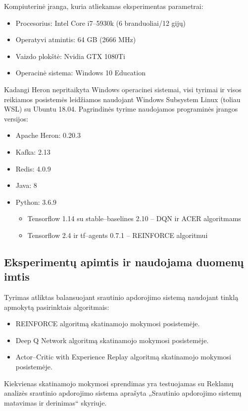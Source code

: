 \documentclass{VUMIFPSbakalaurinis}
\begin{document}
Kompiuterinė įranga, kuria atliekamas eksperimentas parametrai:
\begin{itemize}
    \item Procesorius: Intel Core i7–5930k (6 branduoliai/12 gijų)
    \item Operatyvi atmintis: 64 GB (2666 MHz)
    \item Vaizdo plokštė: Nvidia GTX 1080Ti
    \item Operacinė sistema: Windows 10 Education
\end{itemize}

Kadangi Heron nepritaikyta Windows operacinei sistemai, visi tyrimai ir visos reikiamos posistemės leidžiamos naudojant Windows Subsystem Linux (toliau WSL) su Ubuntu 18.04.
Pagrindinės tyrime naudojamos programinės įrangos versijos:
\begin{itemize}
    \item Apache Heron: 0.20.3
    \item Kafka: 2.13
    \item Redis: 4.0.9
    \item Java: 8
    \item Python: 3.6.9
    \begin{itemize}
        \item Tensorflow 1.14 su stable–baselines 2.10 – DQN ir ACER algoritmams
        \item Tensorflow 2.4 ir tf–agents 0.7.1 – REINFORCE algoritmui
    \end{itemize}
\end{itemize}
\subsection{Eksperimentų apimtis ir naudojama duomenų imtis}

Tyrimas atliktas balansuojant srautinio apdorojimo sistemą naudojant tinklą apmokytą pasirinktais algoritmais:
\begin{itemize}
        \item REINFORCE algoritmą skatinamojo mokymosi posistemėje.
        \item Deep Q Network algoritmą skatinamojo mokymosi posistemėje.
        \item Actor–Critic with Experience Replay algoritmą skatinamojo mokymosi posistemėje.
\end{itemize}

Kiekvienas skatinamojo mokymosi sprendimas yra testuojamas su Reklamų analizės srautinio apdorojimo sistema aprašyta „Srautinio apdorojimo sistemų matavimas ir derinimas“ skyriuje.
\end{document}
